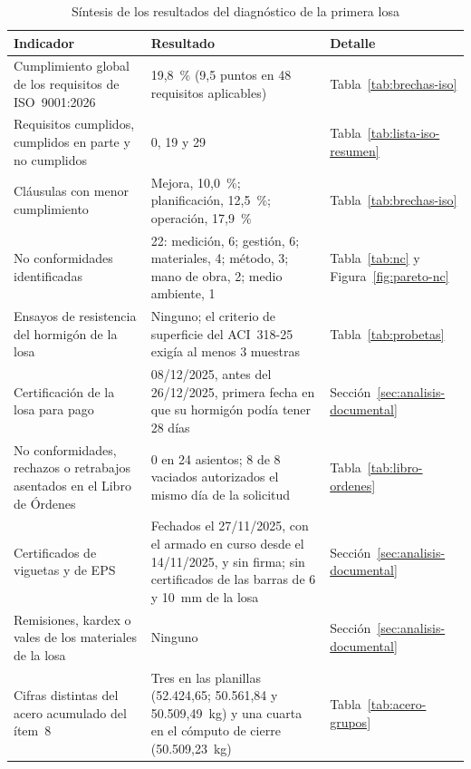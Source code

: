 \begin{table}[H]
\caption{Síntesis de los resultados del diagnóstico de la primera losa}
\label{tab:sintesis-diagnostico}
\setlength{\tabcolsep}{4pt}
\begin{tabularx}{\linewidth}{@{}P{5.2cm}LP{2.9cm}@{}}
\toprule
\textbf{Indicador} & \textbf{Resultado} & \textbf{Detalle} \\
\midrule
Cumplimiento global de los requisitos de ISO~9001:2026 & 19,8~\% (9,5 puntos en 48 requisitos aplicables) & Tabla~\ref{tab:brechas-iso} \\
Requisitos cumplidos, cumplidos en parte y no cumplidos & 0, 19 y 29 & Tabla~\ref{tab:lista-iso-resumen} \\
Cláusulas con menor cumplimiento & Mejora, 10,0~\%; planificación, 12,5~\%; operación, 17,9~\% & Tabla~\ref{tab:brechas-iso} \\
No conformidades identificadas & 22: medición, 6; gestión, 6; materiales, 4; método, 3; mano de obra, 2; medio ambiente, 1 & Tabla~\ref{tab:nc} y Figura~\ref{fig:pareto-nc} \\
Ensayos de resistencia del hormigón de la losa & Ninguno; el criterio de superficie del ACI~318-25 exigía al menos 3 muestras & Tabla~\ref{tab:probetas} \\
Certificación de la losa para pago & 08/12/2025, antes del 26/12/2025, primera fecha en que su hormigón podía tener 28 días & Sección~\ref{sec:analisis-documental} \\
No conformidades, rechazos o retrabajos asentados en el Libro de Órdenes & 0 en 24 asientos; 8 de 8 vaciados autorizados el mismo día de la solicitud & Tabla~\ref{tab:libro-ordenes} \\
Certificados de viguetas y de EPS & Fechados el 27/11/2025, con el armado en curso desde el 14/11/2025, y sin firma; sin certificados de las barras de 6 y 10~mm de la losa & Sección~\ref{sec:analisis-documental} \\
Remisiones, kardex o vales de los materiales de la losa & Ninguno & Sección~\ref{sec:analisis-documental} \\
Cifras distintas del acero acumulado del ítem~8 & Tres en las planillas (52.424,65; 50.561,84 y 50.509,49~kg) y una cuarta en el cómputo de cierre (50.509,23~kg) & Tabla~\ref{tab:acero-grupos} \\
\bottomrule
\end{tabularx}
\end{table}

